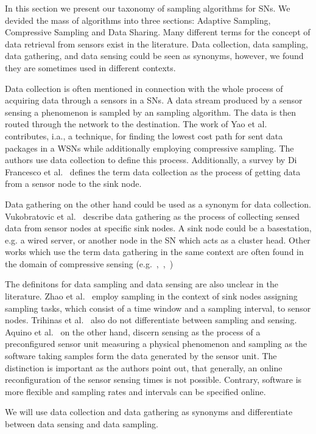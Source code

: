 In this section we present our taxonomy of sampling algorithms for \acp{SN}.
We devided the mass of algorithms into three sections: Adaptive Sampling, Compressive Sampling and Data Sharing.
Many different terms for the concept of data retrieval from sensors exist in the literature. 
Data collection, data sampling, data gathering, and data sensing could be seen as synonyms, however, we found they are sometimes used in different contexts.
\par
Data collection is often mentioned in connection with the whole process of acquiring data through a sensors in a \acp{SN}.
A data stream produced by a sensor sensing a phenomenon is sampled by an sampling algorithm.
The data is then routed through the network to the destination.
The work of Yao et al.~\cite{yao2015edal} contributes, i.a., a technique, for finding the lowest cost path for sent data packages in a \acp{WSN} while additionally employing compressive sampling.
The authors use data collection to define this process.
Additionally, a survey by Di Francesco et al.~\cite{di2011data} defines the term data collection as the process of getting data from a sensor node to the sink node.
\par
Data gathering on the other hand could be used as a synonym for data collection.
Vukobratovic et al.~\cite{vukobratovic2010rateless} describe data gathering as the process of collecting sensed data from sensor nodes at specific sink nodes.
A sink node could be a basestation, e.g. a wired server, or another node in the \ac{SN} which acts as a cluster head.
Other works which use the term data gathering in the same context are often found in the domain of compressive sensing (e.g.~\cite{cheng2013stcdg},~\cite{luo2009compressive},~\cite{wang2012data})
\par
The definitons for data sampling and data sensing are also unclear in the literature. 
Zhao et al.~\cite{zhao2016cats} employ sampling in the context of sink nodes assigning sampling tasks, which consist of a time window and a sampling interval, to sensor nodes.
Trihinas et al.~\cite{trihinas2015adam} also do not differentiate between sampling and sensing.
Aquino et al.~\cite{aquino2014musa} on the other hand, discern sensing as the process of a preconfigured sensor unit measuring a physical phenomenon and sampling as the software taking samples form the data generated by the sensor unit.
The distinction is important as the authors point out, that generally, an online reconfiguration of the sensor sensing times is not possible.
Contrary, software is more flexible and sampling rates and intervals can be specified online.
\par
We will use data collection and data gathering as synonyms and differentiate between data sensing and data sampling.

